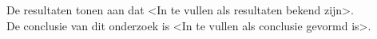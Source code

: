 De resultaten tonen aan dat <In te vullen als resultaten bekend zijn>.\\

De conclusie van dit onderzoek is <In te vullen als conclusie gevormd is>.
